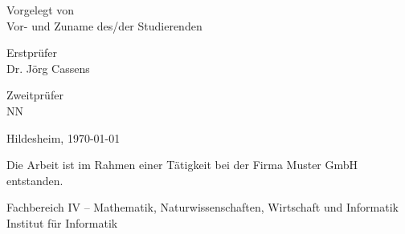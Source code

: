 \documentclass[11pt,        %
  english,ngerman,          %
  paper=a4,                 %
  captions=tablesignature,  %
  listof=numbered,          %
  bibliography=totoc,       %
  headings=small,           %
  headinclude=false,        %
  footinclude=false,        %
  parskip=half-,            %
  oneside,                  %
  BCOR=15mm,                 %
  DIV=12                    %
  ]{scrbook}                %
\begin{document}
\begin{titlepage}
\begin{center}
{%
      Vorgelegt von\\
      Vor- und Zuname des/der Studierenden

      \vfill

      Erstprüfer\\
      Dr. Jörg Cassens
  
      Zweitprüfer\\
      NN

      \vfill
      
      Hildesheim, \today
    }
      
      \vfill
      
    {
      \footnotesize 

      Die Arbeit ist im Rahmen einer Tätigkeit bei der Firma Muster GmbH entstanden.

      \vfill

      Fachbereich IV -- Mathematik, Naturwissenschaften, Wirtschaft und Informatik\\      
      Institut für Informatik
    }
  \end{center}
\end{titlepage}

\end{document}
